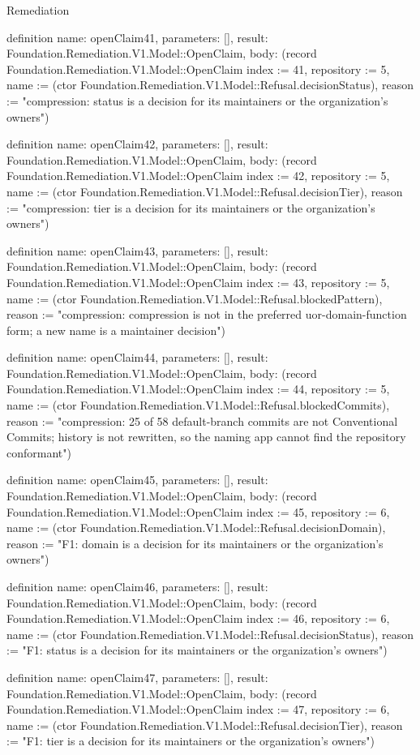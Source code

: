 \begin{lexlean}{Remediation}
\begin{semanticmodule}
definition{
  name: openClaim41,
  parameters: [],
  result: Foundation.Remediation.V1.Model::OpenClaim,
  body: (record Foundation.Remediation.V1.Model::OpenClaim {index := 41, repository := 5, name := (ctor Foundation.Remediation.V1.Model::Refusal.decisionStatus), reason := "compression: status is a decision for its maintainers or the organization's owners"})
}

definition{
  name: openClaim42,
  parameters: [],
  result: Foundation.Remediation.V1.Model::OpenClaim,
  body: (record Foundation.Remediation.V1.Model::OpenClaim {index := 42, repository := 5, name := (ctor Foundation.Remediation.V1.Model::Refusal.decisionTier), reason := "compression: tier is a decision for its maintainers or the organization's owners"})
}

definition{
  name: openClaim43,
  parameters: [],
  result: Foundation.Remediation.V1.Model::OpenClaim,
  body: (record Foundation.Remediation.V1.Model::OpenClaim {index := 43, repository := 5, name := (ctor Foundation.Remediation.V1.Model::Refusal.blockedPattern), reason := "compression: compression is not in the preferred uor-{domain}-{function} form; a new name is a maintainer decision"})
}

definition{
  name: openClaim44,
  parameters: [],
  result: Foundation.Remediation.V1.Model::OpenClaim,
  body: (record Foundation.Remediation.V1.Model::OpenClaim {index := 44, repository := 5, name := (ctor Foundation.Remediation.V1.Model::Refusal.blockedCommits), reason := "compression: 25 of 58 default-branch commits are not Conventional Commits; history is not rewritten, so the naming app cannot find the repository conformant"})
}

definition{
  name: openClaim45,
  parameters: [],
  result: Foundation.Remediation.V1.Model::OpenClaim,
  body: (record Foundation.Remediation.V1.Model::OpenClaim {index := 45, repository := 6, name := (ctor Foundation.Remediation.V1.Model::Refusal.decisionDomain), reason := "F1: domain is a decision for its maintainers or the organization's owners"})
}

definition{
  name: openClaim46,
  parameters: [],
  result: Foundation.Remediation.V1.Model::OpenClaim,
  body: (record Foundation.Remediation.V1.Model::OpenClaim {index := 46, repository := 6, name := (ctor Foundation.Remediation.V1.Model::Refusal.decisionStatus), reason := "F1: status is a decision for its maintainers or the organization's owners"})
}

definition{
  name: openClaim47,
  parameters: [],
  result: Foundation.Remediation.V1.Model::OpenClaim,
  body: (record Foundation.Remediation.V1.Model::OpenClaim {index := 47, repository := 6, name := (ctor Foundation.Remediation.V1.Model::Refusal.decisionTier), reason := "F1: tier is a decision for its maintainers or the organization's owners"})
}


\end{semanticmodule}
\end{lexlean}
